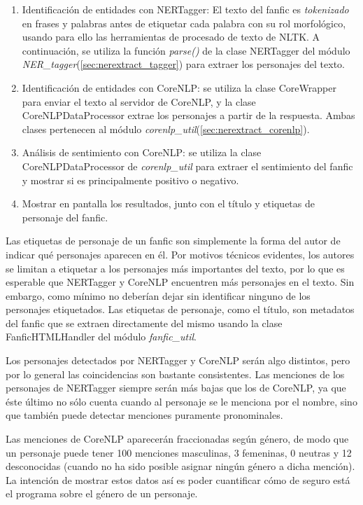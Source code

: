 \documentclass{pre-tfg}
\begin{document}
\begin{enumerate}
	\item Identificación de entidades con NERTagger: El texto del fanfic es \textit{tokenizado} en frases y palabras antes de etiquetar cada palabra con su rol morfológico, usando para ello las herramientas de procesado de texto de NLTK. A continuación, se utiliza la función \textit{parse()} de la clase NERTagger del módulo \textit{NER\_tagger}(\ref{sec:nerextract_tagger}) para extraer los personajes del texto.
	\item Identificación de entidades con CoreNLP: se utiliza la clase CoreWrapper para enviar el texto al servidor de CoreNLP, y la clase CoreNLPDataProcessor extrae los personajes a partir de la respuesta. Ambas clases pertenecen al módulo \textit{corenlp\_util}(\ref{sec:nerextract_corenlp}).
	\item Análisis de sentimiento con CoreNLP: se utiliza la clase CoreNLPDataProcessor de \textit{corenlp\_util} para extraer el sentimiento del fanfic y mostrar si es principalmente positivo o negativo.
	\item Mostrar en pantalla los resultados, junto con el título y etiquetas de personaje del fanfic.
\end{enumerate}

Las etiquetas de personaje de un fanfic son simplemente la forma del autor de indicar qué personajes aparecen en él. Por motivos técnicos evidentes, los autores se limitan a etiquetar a los personajes más importantes del texto, por lo que es esperable que NERTagger y CoreNLP encuentren más personajes en el texto. Sin embargo, como mínimo no deberían dejar sin identificar ninguno de los personajes etiquetados.
Las etiquetas de personaje, como el título, son metadatos del fanfic que se extraen directamente del mismo usando la clase FanficHTMLHandler del módulo \textit{fanfic\_util}.

Los personajes detectados por NERTagger y CoreNLP serán algo distintos, pero por lo general las coincidencias son bastante consistentes. Las menciones de los personajes de NERTagger siempre serán más bajas que los de CoreNLP, ya que éste último no sólo cuenta cuando al personaje se le menciona por el nombre, sino que también puede detectar menciones puramente pronominales.

Las menciones de CoreNLP aparecerán fraccionadas según género, de modo que un personaje puede tener 100 menciones masculinas, 3 femeninas, 0 neutras y 12 desconocidas (cuando no ha sido posible asignar ningún género a dicha mención). La intención de mostrar estos datos así es poder cuantificar cómo de seguro está el programa sobre el género de un personaje.
\end{document}
